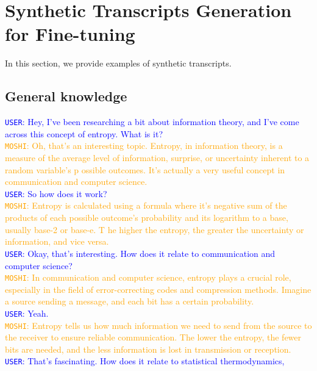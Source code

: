\newpage

\label{app:safety}

\clearpage
\section{Synthetic Transcripts Generation for Fine-tuning}
In this section, we provide examples of synthetic transcripts.

\subsection{General knowledge}


\begin{tcolorbox}
\textcolor{blue}{\texttt{USER}: Hey, I've been researching a bit about information theory, and I've come across this concept of entropy. What is it?} \\
\textcolor{orange}{\texttt{MOSHI}: Oh, that's an interesting topic. Entropy, in information theory, is a measure of the average level of information, surprise, or uncertainty inherent to a random variable's p
ossible outcomes. It's actually a very useful concept in communication and computer science.} \\
\textcolor{blue}{\texttt{USER}: So how does it work?} \\
\textcolor{orange}{\texttt{MOSHI}: Entropy is calculated using a formula where it's negative sum of the products of each possible outcome's probability and its logarithm to a base, usually base-2 or base-e. T
he higher the entropy, the greater the uncertainty or information, and vice versa.} \\
\textcolor{blue}{\texttt{USER}: Okay, that's interesting. How does it relate to communication and computer science?} \\
\textcolor{orange}{\texttt{MOSHI}: In communication and computer science, entropy plays a crucial role, especially in the field of error-correcting codes and compression methods. Imagine a source sending a message, and each bit has a certain probability.} \\
\textcolor{blue}{\texttt{USER}: Yeah.} \\
\textcolor{orange}{\texttt{MOSHI}: Entropy tells us how much information we need to send from the source to the receiver to ensure reliable communication. The lower the entropy, the fewer bits are needed, and the less information is lost in transmission or reception.} \\
\textcolor{blue}{\texttt{USER}: That's fascinating. How does it relate to statistical thermodynamics,} \\

\end{tcolorbox}
